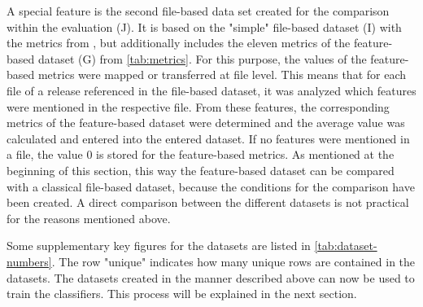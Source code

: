 A special feature is the second file-based data set created for the comparison within the evaluation (J). It is based on the "simple" file-based dataset (I) with the metrics from \cite{Moser2008}, but additionally includes the eleven metrics of the feature-based dataset (G) from \autoref{tab:metrics}. For this purpose, the values of the feature-based metrics were mapped or transferred at file level. This means that for each file of a release referenced in the file-based dataset, it was analyzed which features were mentioned in the respective file. From these features, the corresponding metrics of the feature-based dataset were determined and the average value was calculated and entered into the entered dataset. If no features were mentioned in a file, the value 0 is stored for the feature-based metrics. As mentioned at the beginning of this section, this way the feature-based dataset can be compared with a classical file-based dataset, because the conditions for the comparison have been created. A direct comparison between the different datasets is not practical for the reasons mentioned above.

Some supplementary key figures for the datasets are listed in \autoref{tab:dataset-numbers}. The row "unique" indicates how many unique rows are contained in the datasets. The datasets created in the manner described above can now be used to train the classifiers. This process will be explained in the next section.

